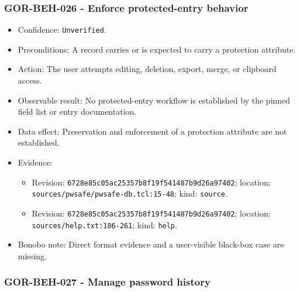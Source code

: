\documentclass[
  letterpaper,
]{article}
\newcommand{\passthrough}[1]{#1}
\providecommand{\tightlist}{%
  \setlength{\itemsep}{0pt}\setlength{\parskip}{0pt}}
\begin{document}
\subsubsection{GOR-BEH-026 - Enforce protected-entry behavior}\label{gor-beh-026---enforce-protected-entry-behavior}

\begin{itemize}
\tightlist
\item
  Confidence: \nolinkurl{Unverified}.
\item
  Preconditions: A record carries or is expected to carry a protection attribute.
\item
  Action: The user attempts editing, deletion, export, merge, or clipboard access.
\item
  Observable result: No protected-entry workflow is established by the pinned field list or entry documentation.
\item
  Data effect: Preservation and enforcement of a protection attribute are not established.
\item
  Evidence:

  \begin{itemize}
  \tightlist
  \item
    Revision: \nolinkurl{6728e85c05ac25357b8f19f541487b9d26a97402}; location:
    \nolinkurl{sources/pwsafe/pwsafe-db.tcl:15-48}; kind: \passthrough{\lstinline!source!}.
  \item
    Revision: \nolinkurl{6728e85c05ac25357b8f19f541487b9d26a97402}; location: \nolinkurl{sources/help.txt:186-261};
    kind: \passthrough{\lstinline!help!}.
  \end{itemize}
\item
  Bonobo note: Direct format evidence and a user-visible black-box case are missing.
\end{itemize}

\subsubsection{GOR-BEH-027 - Manage password history}\label{gor-beh-027---manage-password-history}
\end{document}
